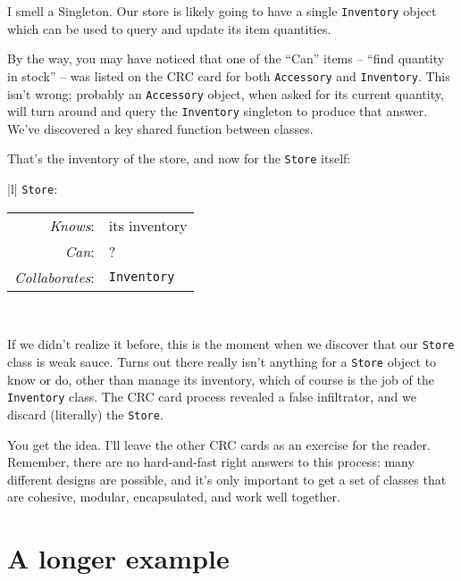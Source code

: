 I smell a Singleton. Our store is likely going to have a single
\texttt{Inventory} object which can be used to query and update its item
quantities.

By the way, you may have noticed that one of the ``Can'' items --
``find quantity in stock'' -- was listed on the CRC card for both
\texttt{Accessory} and \texttt{Inventory}. This isn't wrong; probably an
\texttt{Accessory} object, when asked for its current quantity, will turn
around and query the \texttt{Inventory} singleton to produce that answer.
We've discovered a key shared function between classes.

That's the inventory of the store, and now for the \texttt{Store} itself:

\bigskip
{}
\begin{center}
\begin{tabular}{|l|}
\hline
\texttt{Store}:\\
\hline
\begin{tabular}{rl}
\textit{Knows}: & its inventory \\
\textit{Can}: & ? \\
\hline
\textit{Collaborates}: & \texttt{Inventory} \\
\end{tabular}\\
\hline
\end{tabular}
\end{center}

\bigskip
If we didn't realize it before, this is the moment when we discover that our
\texttt{Store} class is weak sauce. Turns out there really isn't anything for
a \texttt{Store} object to know or do, other than manage its inventory, which
of course is the job of the \texttt{Inventory} class. The CRC card process
revealed a false infiltrator, and we discard (literally) the \texttt{Store}.

You get the idea. I'll leave the other CRC cards as an exercise for the
reader. Remember, there are no hard-and-fast right answers to this process:
many different designs are possible, and it's only important to get a set of
classes that are cohesive, modular, encapsulated, and work well together.


\vspace{2.8in}

\pagebreak

\section{A longer example}

